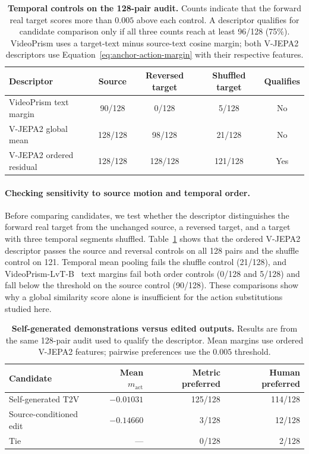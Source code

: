 \begin{table}[!htbp]
 \centering
 \caption{\textbf{Temporal controls on the 128-pair audit.}
 Counts indicate that the forward real target scores more than $0.005$
 above each control. A descriptor qualifies for candidate comparison only
 if all three counts reach at least 96/128 (75\%). VideoPrism uses a target-text
 minus source-text cosine margin; both V-JEPA2 descriptors use
 Equation~\ref{eq:anchor-action-margin} with their respective features.}
 \label{tab:anchor-temporal-controls}
 \small
 \renewcommand{\arraystretch}{1.12}
 \setlength{\tabcolsep}{7.5pt}
 \begin{tabular}{@{}lcccc@{}}
 \toprule
 Descriptor & Source & Reversed target & Shuffled target & Qualifies \\
 \midrule
 VideoPrism text margin & 90/128 & 0/128 & 5/128 & No \\
 V-JEPA2 global mean & 128/128 & 98/128 & 21/128 & No \\
 V-JEPA2 ordered residual & 128/128 & 128/128 & 121/128 & Yes \\
 \bottomrule
 \end{tabular}
\end{table}

\paragraph{Checking sensitivity to source motion and temporal order.}
Before comparing candidates, we test whether the descriptor distinguishes
the forward real target from the unchanged source, a reversed target, and
a target with three temporal segments shuffled.
Table~\ref{tab:anchor-temporal-controls} shows that the ordered V-JEPA2
descriptor passes the source and reversal controls on all 128 pairs and the
shuffle control on 121. Temporal mean pooling fails the shuffle control
(21/128), and VideoPrism-LvT-B~\citep{zhao2024videoprism} text margins fail
both order controls (0/128 and 5/128) and fall below the threshold on the
source control (90/128). These comparisons show why a global
similarity score alone is insufficient for the action substitutions studied here.

\begin{table}[!htbp]
 \centering
 \caption{\textbf{Self-generated demonstrations versus edited outputs.}
 Results are from the same 128-pair audit used to qualify the descriptor.
 Mean margins use
 ordered V-JEPA2 features; pairwise preferences use the $0.005$ threshold.}
 \label{tab:anchor-generation-editing-gap}
 \small
 \renewcommand{\arraystretch}{1.12}
 \setlength{\tabcolsep}{9pt}
 \begin{tabular}{@{}lrrr@{}}
 \toprule
 Candidate & Mean $m_{\mathrm{act}}$ & Metric preferred & Human preferred \\
 \midrule
 Self-generated T2V & $-0.01031$ & 125/128 & 114/128 \\
 Source-conditioned edit & $-0.14660$ & 3/128 & 12/128 \\
 Tie & --- & 0/128 & 2/128 \\
 \bottomrule
 \end{tabular}
\end{table}

